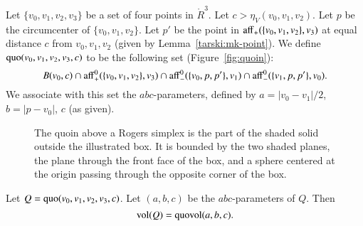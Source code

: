 \begin{definition}\label{def:quoin}
Let $\{v_0,v_1,v_2,v_3\}$ be a set of four points in $\ring{R}^3$.
Let $c>  \eta_V(v_0,v_1,v_2)$.  Let $p$ be the circumcenter
of $\{v_0,v_1,v_2\}$.  Let $p'$ be the point 
in ${\operatorname{aff}}_+(\{v_0,v_1,v_2\},v_3)$ at equal distance $c$
from $v_0,v_1,v_2$ (given by Lemma~\ref{tarski:mk-point}).
We define
${\operatorname{quo}}(v_0,v_1,v_2,v_3,c)$ to be the following set 
(Figure~\ref{fig:quoin}):
   $$
   B(v_0,c) \cap {\operatorname{aff}}_+^0(\{v_0,v_1,v_2\},v_3)
   \cap {\operatorname{aff}}_-^0(\{v_0,p,p'\},v_1) \cap
   {\operatorname{aff}}_-^0(\{v_1,p,p'\},v_0).
   $$
We associate with this set the $abc$-parameters, defined
by $a = |v_0-v_1|/2$, $b=|p-v_0|$, $c$ (as given).
\end{definition}

\begin{figure}[htb]
  \centering
  \caption{The quoin above a Rogers simplex is the part of the
  shaded solid outside
   the illustrated box.  It is bounded by the two
  shaded planes, the plane through
   the front face of the box, and a sphere
   centered at the origin passing through the opposite corner of the box.}
\end{figure}



\begin{lemma}
Let $Q={\operatorname{quo}}(v_0,v_1,v_2,v_3,c)$. Let $(a,b,c)$ be the
$abc$-parameters of $Q$.  
Then $${\operatorname{vol}}(Q) = {\operatorname{quovol}}(a,b,c).$$
%
\end{lemma}

